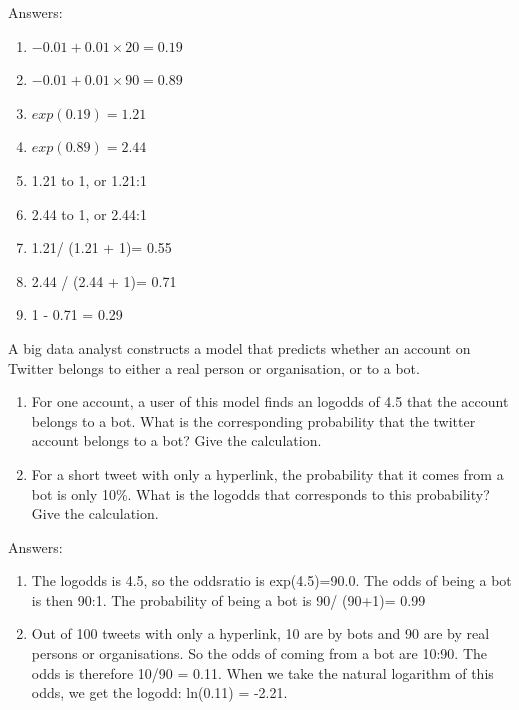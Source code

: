 \documentclass[]{report}\usepackage[]{graphicx}\usepackage[]{color}
\begin{document}
Answers:

\begin{enumerate}

\item
$-0.01 + 0.01 \times 20 = 0.19$

\item
$-0.01 + 0.01 \times 90 = 0.89$

\item
$exp(0.19)=1.21$

\item
$exp(0.89)=2.44$

\item
1.21 to 1, or 1.21:1

\item
2.44 to 1, or 2.44:1

\item
1.21/ (1.21 + 1)= 0.55

\item
2.44 / (2.44 + 1)= 0.71

\item
1 - 0.71 = 0.29


\end{enumerate}


A big data analyst constructs a model that predicts whether an account on Twitter belongs to either a real person or organisation, or to a bot.

\begin{enumerate}

\item
For one account, a user of this model finds an logodds of 4.5 that the account belongs to a bot. What is the corresponding probability that the twitter account belongs to a bot? Give the calculation.

\item
For a short tweet with only a hyperlink, the probability that it comes from a bot is only 10\%. What is the logodds that corresponds to this probability? Give the calculation.


\end{enumerate}



Answers:
\begin{enumerate}

\item The logodds is 4.5, so the oddsratio is exp(4.5)=90.0.
The odds of being a bot is then 90:1.
The probability of being a bot is 90/ (90+1)= 0.99

\item
Out of 100 tweets with only a hyperlink, 10 are by bots and 90 are by real persons or organisations. So the odds of coming from a bot are 10:90. The odds is therefore 10/90 = 0.11. When we take the natural logarithm of this odds, we get the logodd: ln(0.11) = -2.21.

\end{enumerate}
\end{document}
